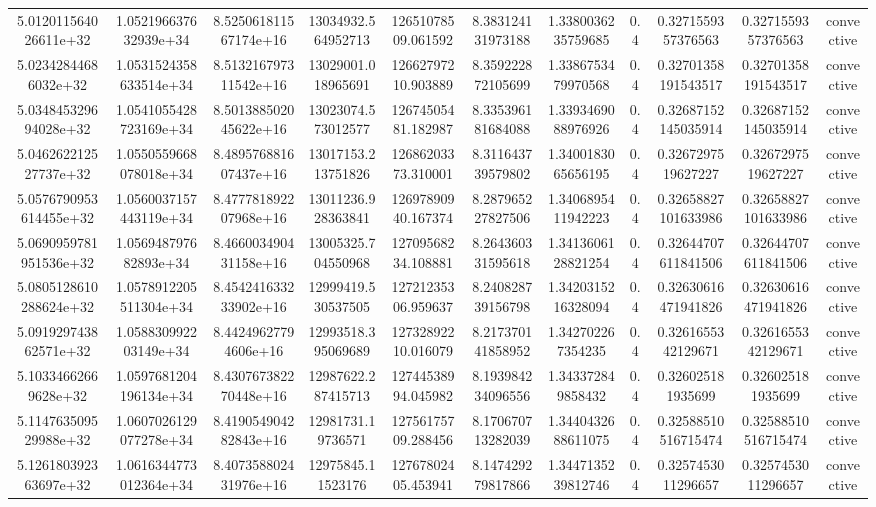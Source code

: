 \begin{table}
\begin{tabular}{ccccccccccc}
5.012011564026611e+32 & 1.052196637632939e+34 & 8.525061811567174e+16 & 13034932.564952713 & 12651078509.061592 & 8.383124131973188 & 1.3380036235759685 & 0.4 & 0.3271559357376563 & 0.3271559357376563 & convective \\
5.02342844686032e+32 & 1.0531524358633514e+34 & 8.513216797311542e+16 & 13029001.018965691 & 12662797210.903889 & 8.359222872105699 & 1.3386753479970568 & 0.4 & 0.32701358191543517 & 0.32701358191543517 & convective \\
5.034845329694028e+32 & 1.0541055428723169e+34 & 8.501388502045622e+16 & 13023074.573012577 & 12674505481.182987 & 8.335396181684088 & 1.3393469088976926 & 0.4 & 0.32687152145035914 & 0.32687152145035914 & convective \\
5.046262212527737e+32 & 1.0550559668078018e+34 & 8.489576881607437e+16 & 13017153.213751826 & 12686203373.310001 & 8.311643739579802 & 1.3400183065656195 & 0.4 & 0.3267297519627227 & 0.3267297519627227 & convective \\
5.0576790953614455e+32 & 1.0560037157443119e+34 & 8.477781892207968e+16 & 13011236.928363841 & 12697890940.167374 & 8.287965227827506 & 1.3406895411942223 & 0.4 & 0.32658827101633986 & 0.32658827101633986 & convective \\
5.0690959781951536e+32 & 1.056948797682893e+34 & 8.466003490431158e+16 & 13005325.704550968 & 12709568234.108881 & 8.264360331595618 & 1.3413606128821254 & 0.4 & 0.32644707611841506 & 0.32644707611841506 & convective \\
5.0805128610288624e+32 & 1.0578912205511304e+34 & 8.454241633233902e+16 & 12999419.530537505 & 12721235306.959637 & 8.240828739156798 & 1.3420315216328094 & 0.4 & 0.32630616471941826 & 0.32630616471941826 & convective \\
5.091929743862571e+32 & 1.058830992203149e+34 & 8.44249627794606e+16 & 12993518.395069689 & 12732892210.016079 & 8.217370141858952 & 1.342702267354235 & 0.4 & 0.3261655342129671 & 0.3261655342129671 & convective \\
5.10334662669628e+32 & 1.0597681204196134e+34 & 8.430767382270448e+16 & 12987622.287415713 & 12744538994.045982 & 8.193984234096556 & 1.343372849858432 & 0.4 & 0.326025181935699 & 0.326025181935699 & convective \\
5.114763509529988e+32 & 1.0607026129077278e+34 & 8.419054904282843e+16 & 12981731.19736571 & 12756175709.288456 & 8.170670713282039 & 1.3440432688611075 & 0.4 & 0.32588510516715474 & 0.32588510516715474 & convective \\
5.126180392363697e+32 & 1.0616344773012364e+34 & 8.407358802431976e+16 & 12975845.11523176 & 12767802405.453941 & 8.147429279817866 & 1.3447135239812746 & 0.4 & 0.3257453011296657 & 0.3257453011296657 & convective \\

\end{tabular}
\end{table}
